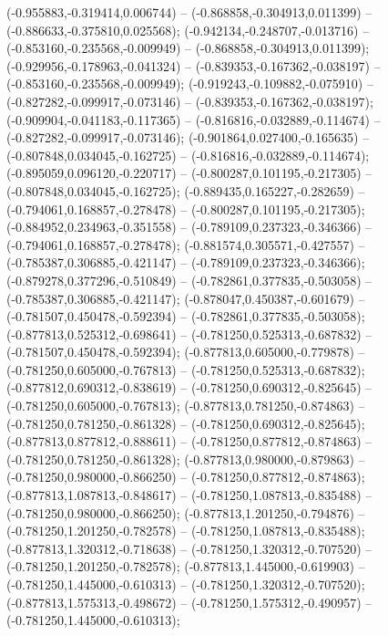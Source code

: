  (-0.955883,-0.319414,0.006744) -- (-0.868858,-0.304913,0.011399) -- (-0.886633,-0.375810,0.025568);
 (-0.942134,-0.248707,-0.013716) -- (-0.853160,-0.235568,-0.009949) -- (-0.868858,-0.304913,0.011399);
 (-0.929956,-0.178963,-0.041324) -- (-0.839353,-0.167362,-0.038197) -- (-0.853160,-0.235568,-0.009949);
 (-0.919243,-0.109882,-0.075910) -- (-0.827282,-0.099917,-0.073146) -- (-0.839353,-0.167362,-0.038197);
 (-0.909904,-0.041183,-0.117365) -- (-0.816816,-0.032889,-0.114674) -- (-0.827282,-0.099917,-0.073146);
 (-0.901864,0.027400,-0.165635) -- (-0.807848,0.034045,-0.162725) -- (-0.816816,-0.032889,-0.114674);
 (-0.895059,0.096120,-0.220717) -- (-0.800287,0.101195,-0.217305) -- (-0.807848,0.034045,-0.162725);
 (-0.889435,0.165227,-0.282659) -- (-0.794061,0.168857,-0.278478) -- (-0.800287,0.101195,-0.217305);
 (-0.884952,0.234963,-0.351558) -- (-0.789109,0.237323,-0.346366) -- (-0.794061,0.168857,-0.278478);
 (-0.881574,0.305571,-0.427557) -- (-0.785387,0.306885,-0.421147) -- (-0.789109,0.237323,-0.346366);
 (-0.879278,0.377296,-0.510849) -- (-0.782861,0.377835,-0.503058) -- (-0.785387,0.306885,-0.421147);
 (-0.878047,0.450387,-0.601679) -- (-0.781507,0.450478,-0.592394) -- (-0.782861,0.377835,-0.503058);
 (-0.877813,0.525312,-0.698641) -- (-0.781250,0.525313,-0.687832) -- (-0.781507,0.450478,-0.592394);
 (-0.877813,0.605000,-0.779878) -- (-0.781250,0.605000,-0.767813) -- (-0.781250,0.525313,-0.687832);
 (-0.877812,0.690312,-0.838619) -- (-0.781250,0.690312,-0.825645) -- (-0.781250,0.605000,-0.767813);
 (-0.877813,0.781250,-0.874863) -- (-0.781250,0.781250,-0.861328) -- (-0.781250,0.690312,-0.825645);
 (-0.877813,0.877812,-0.888611) -- (-0.781250,0.877812,-0.874863) -- (-0.781250,0.781250,-0.861328);
 (-0.877813,0.980000,-0.879863) -- (-0.781250,0.980000,-0.866250) -- (-0.781250,0.877812,-0.874863);
 (-0.877813,1.087813,-0.848617) -- (-0.781250,1.087813,-0.835488) -- (-0.781250,0.980000,-0.866250);
 (-0.877813,1.201250,-0.794876) -- (-0.781250,1.201250,-0.782578) -- (-0.781250,1.087813,-0.835488);
 (-0.877813,1.320312,-0.718638) -- (-0.781250,1.320312,-0.707520) -- (-0.781250,1.201250,-0.782578);
 (-0.877813,1.445000,-0.619903) -- (-0.781250,1.445000,-0.610313) -- (-0.781250,1.320312,-0.707520);
 (-0.877813,1.575313,-0.498672) -- (-0.781250,1.575312,-0.490957) -- (-0.781250,1.445000,-0.610313);
